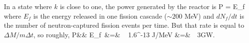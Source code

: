 \documentclass[11pt]{book}
\begin{document}
%
%


In a state where $k$ is close to one, the power generated by the reactor is
\be
P = E_f 
\ee
where $E_f$ is the energy released in one fission cascade ($\sim200$ MeV) and $dN_f/dt$ is the number of neutron-captured fission events per time. But that rate is equal to $\Delta M/m\Delta t$, so roughly,
\bea
P&\simeq & E_f\, \vs
&=&
\,\, \,1.6^{-13} J/MeV
\vs
&=&
\,\, 3GW.
\eea

%
%
\end{document}
